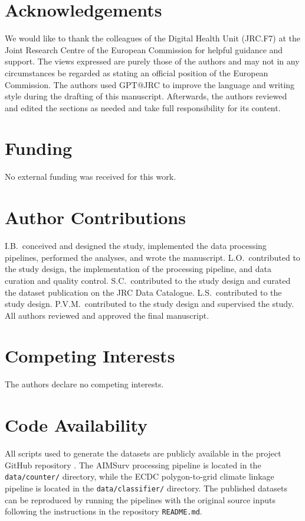 \documentclass[11pt]{article}
\begin{document}
\section*{Acknowledgements}
We would like to thank the colleagues of the Digital Health Unit (JRC.F7) at the Joint Research Centre of the European Commission for helpful guidance and support.
The views expressed are purely those of the authors and may not in any circumstances be regarded as stating an official position of the European Commission. The authors used GPT@JRC to improve the language and writing style during the drafting of this manuscript. Afterwards, the authors reviewed and edited the sections as needed and take full responsibility for its content. 

\section*{Funding}
No external funding was received for this work. %


\section*{Author Contributions}
I.B.\ conceived and designed the study, implemented the data processing 
pipelines, performed the analyses, and wrote the manuscript.
L.O.\ contributed to the study design, the implementation of the 
processing pipeline, and data curation and quality control. 
S.C.\ contributed to the study 
design and curated the dataset publication on the JRC Data Catalogue. 
L.S.\ contributed to the study design. 
P.V.M.\ contributed to the study design and supervised the study. 
All authors reviewed and approved the final manuscript.

\section*{Competing Interests}
The authors declare no competing interests.


\section*{Code Availability}
All scripts used to generate the datasets are publicly available in the project GitHub repository \cite{aedes_data_repo}. The AIMSurv processing pipeline is located in the \texttt{data/counter/} directory, while the ECDC polygon-to-grid climate linkage pipeline is located in the \texttt{data/classifier/} directory. The published datasets can be reproduced by running the pipelines with the original source inputs following the instructions in the repository \texttt{README.md}.
\end{document}
